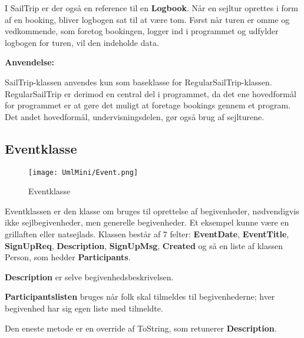 I SailTrip er der også en reference til en \textbf{Logbook}.
Når en sejltur oprettes i form af en booking, bliver logbogen sat til at være tom.
Først når turen er omme og vedkommende, som foretog bookingen, logger ind i programmet og udfylder logbogen for turen, vil den indeholde data.

\textbf{Anvendelse:}

SailTrip-klassen anvendes kun som baseklasse for RegularSailTrip-klassen. 
RegularSailTrip er derimod en central del i programmet, da det ene hovedformål for programmet er at gøre det muligt at foretage bookings gennem et program. Det andet hovedformål, undervisningsdelen, gør også brug af sejlturene. 

\subsection{Eventklasse}

\begin{wrapfigure}[10]{R}{0.5\textwidth}
    \label{img:login_interface}
    \vspace{-20pt}
    \begin{center}
        \texttt{[image: UmlMini/Event.png]}
    \end{center}
    \vspace{-20pt}
    \caption{Eventklasse}
\end{wrapfigure}
Eventklassen er den klasse om bruges til oprettelse af  begivenheder, nødvendigvis ikke sejlbegivenheder, men generelle begivenheder. Et eksempel kunne være en grillaften eller natsejlads. Klassen består af 7 felter: \textbf{EventDate}, \textbf{EventTitle}, \textbf{SignUpReq}, \textbf{Description}, \textbf{SignUpMsg}, \textbf{Created} og så en liste af klassen Person, som hedder \textbf{Participants}.

\textbf{Description} er selve begivenhedsbeskrivelsen. 

\textbf{Participantslisten} bruges når folk skal tilmeldes til begivenhederne; hver begivenhed har sig egen liste med tilmeldte. 

Den eneste metode er en override af ToString, som retunerer \textbf{Description}.


